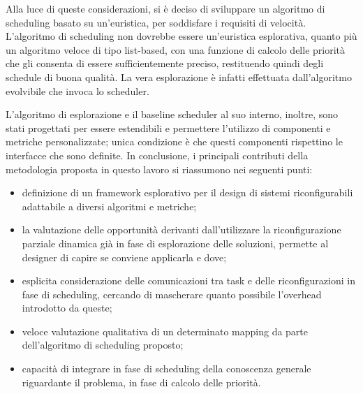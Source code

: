 Alla luce di queste considerazioni, si è deciso di sviluppare un algoritmo di scheduling basato su
un'euristica, per soddisfare i requisiti di velocità. L'algoritmo di scheduling non
dovrebbe essere un'euristica esplorativa, quanto più un algoritmo veloce di tipo list-based,
con una funzione di calcolo delle priorità che gli consenta di essere sufficientemente preciso,
restituendo quindi degli schedule di buona qualità.
La vera esplorazione \`e infatti effettuata dall'algoritmo evolvibile che invoca lo scheduler.

L'algoritmo di esplorazione e il baseline scheduler al suo interno, inoltre, sono stati progettati
per essere estendibili e permettere l'utilizzo di componenti e metriche personalizzate; unica condizione
\`e che questi componenti rispettino le interfacce che sono definite.
In conclusione, i principali contributi della metodologia proposta in questo lavoro
si riassumono nei seguenti punti:
\begin{itemize}
  \item definizione di un framework esplorativo per il design di sistemi riconfigurabili adattabile
    a diversi algoritmi e metriche;
  \item la valutazione delle opportunit\`a derivanti dall'utilizzare la riconfigurazione parziale dinamica gi\`a
    in fase di esplorazione delle soluzioni, permette al designer di capire se conviene applicarla e dove;
  \item esplicita considerazione delle comunicazioni tra task e delle riconfigurazioni in fase di scheduling,
    cercando di mascherare quanto possibile l'overhead introdotto da queste;
  \item veloce valutazione qualitativa di un determinato mapping da parte dell'algoritmo di scheduling proposto;
  \item capacit\`a di integrare in fase di scheduling della conoscenza generale riguardante
    il problema, in fase di calcolo delle priorit\`a.
\end{itemize}

